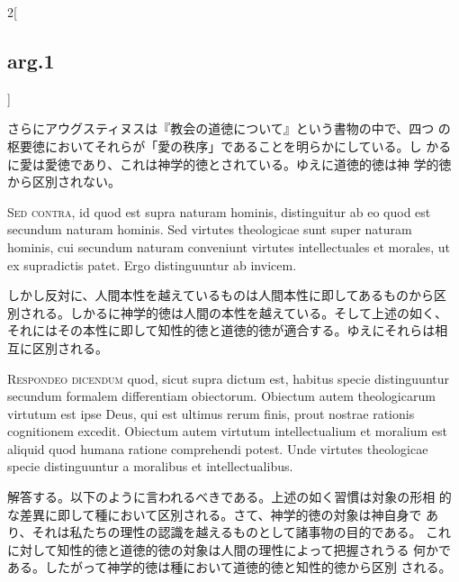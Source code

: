 \documentclass[paper=a4paper,fontsize=10pt,jafontsize=9pt,titlepage]{jlreq}
\begin{document}
\begin{paracol}{2}[\subsection{arg.1}]
\switchcolumn

さらにアウグスティヌスは『教会の道徳について』という書物の中で、四つ
 の枢要徳においてそれらが「愛の秩序」であることを明らかにしている。し
 かるに愛は愛徳であり、これは神学的徳とされている。ゆえに道徳的徳は神
 学的徳から区別されない。

\switchcolumn*[\subsection{s.c.}]

{\scshape Sed contra}, id quod est supra naturam hominis, distinguitur
ab eo quod est secundum naturam hominis. Sed virtutes theologicae sunt
super naturam hominis, cui secundum naturam conveniunt virtutes
intellectuales et morales, ut ex supradictis patet. Ergo distinguuntur
ab invicem.

\switchcolumn

しかし反対に、人間本性を越えているものは人間本性に即してあるものから区
別される。しかるに神学的徳は人間の本性を越えている。そして上述の如く、
それにはその本性に即して知性的徳と道徳的徳が適合する。ゆえにそれらは相
互に区別される。


{\scshape Respondeo dicendum} quod, sicut supra dictum est, habitus
specie distinguuntur secundum formalem differentiam
obiectorum. Obiectum autem theologicarum virtutum est ipse Deus, qui
est ultimus rerum finis, prout nostrae rationis cognitionem
excedit. Obiectum autem virtutum intellectualium et moralium est
aliquid quod humana ratione comprehendi potest. Unde virtutes
theologicae specie distinguuntur a moralibus et intellectualibus.

\switchcolumn

解答する。以下のように言われるべきである。上述の如く習慣は対象の形相
 的な差異に即して種において区別される。さて、神学的徳の対象は神自身で
 あり、それは私たちの理性の認識を越えるものとして諸事物の目的である。
 これに対して知性的徳と道徳的徳の対象は人間の理性によって把握されうる
 何かである。したがって神学的徳は種において道徳的徳と知性的徳から区別
 される。

\switchcolumn*[\subsection{ad.1}]


\end{paracol}
\end{document}
